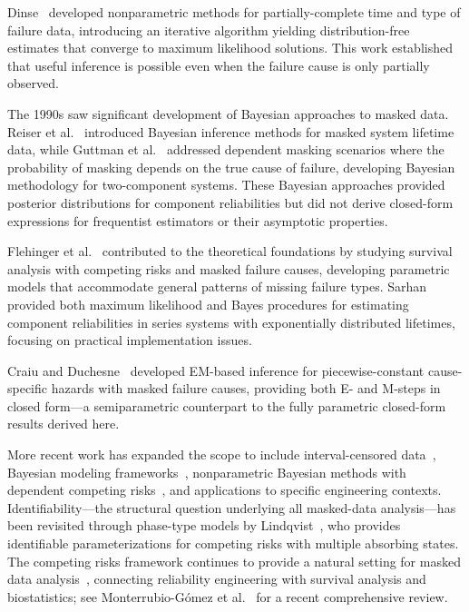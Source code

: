 \documentclass[pdflatex,sn-mathphys-num,Numbered]{sn-jnl}
\theoremstyle{thmstyleone}
\theoremstyle{thmstylethree}
\theoremstyle{thmstyletwo}
\begin{document}
Dinse~\cite{dinse1982} developed nonparametric methods for partially-complete time and type of failure data, introducing an iterative algorithm yielding distribution-free estimates that converge to maximum likelihood solutions. This work established that useful inference is possible even when the failure cause is only partially observed.

The 1990s saw significant development of Bayesian approaches to masked data. Reiser et al.~\cite{reiser1995} introduced Bayesian inference methods for masked system lifetime data, while Guttman et al.~\cite{guttman1995} addressed dependent masking scenarios where the probability of masking depends on the true cause of failure, developing Bayesian methodology for two-component systems. These Bayesian approaches provided posterior distributions for component reliabilities but did not derive closed-form expressions for frequentist estimators or their asymptotic properties.

Flehinger et al.~\cite{flehinger1998,flehinger2002} contributed to the theoretical foundations by studying survival analysis with competing risks and masked failure causes, developing parametric models that accommodate general patterns of missing failure types. Sarhan~\cite{sarhan2001} provided both maximum likelihood and Bayes procedures for estimating component reliabilities in series systems with exponentially distributed lifetimes, focusing on practical implementation issues.

Craiu and Duchesne~\cite{craiu2004} developed EM-based inference for piecewise-constant cause-specific hazards with masked failure causes, providing both E- and M-steps in closed form---a semiparametric counterpart to the fully parametric closed-form results derived here.

More recent work has expanded the scope to include interval-censored data~\cite{reliability}, Bayesian modeling frameworks~\cite{kuo2007}, nonparametric Bayesian methods with dependent competing risks~\cite{liu2021}, and applications to specific engineering contexts. Identifiability---the structural question underlying all masked-data analysis---has been revisited through phase-type models by Lindqvist~\cite{lindqvist2023}, who provides identifiable parameterizations for competing risks with multiple absorbing states. The competing risks framework continues to provide a natural setting for masked data analysis~\cite{agustin}, connecting reliability engineering with survival analysis and biostatistics; see Monterrubio-G\'omez et al.~\cite{monterrubio2024} for a recent comprehensive review.
\end{document}
